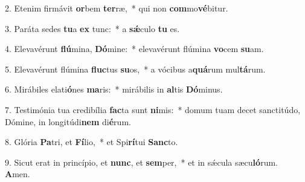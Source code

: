 2. Etenim firmávit \textbf{or}bem \textbf{ter}ræ,~*  qui non \textbf{com}mo\textbf{vé}bitur.\

3. Paráta sedes \textbf{tu}a \textbf{ex} tunc:~*  a \textbf{sǽ}culo \textbf{tu} es.\

4. Elevavérunt \textbf{flú}mina, \textbf{Dó}mine:~*  elevavérunt flúmina \textbf{vo}cem \textbf{su}am.\

5. Elevavérunt flúmina \textbf{fluc}tus \textbf{su}os,~*  a vócibus a\textbf{quá}rum mul\textbf{tá}rum.\

6. Mirábiles elati\textbf{ó}nes \textbf{ma}ris:~*  mirábilis in \textbf{al}tis \textbf{Dó}minus.\

7. Testimónia tua credibília \textbf{fac}ta sunt \textbf{ni}mis:~*  domum tuam decet sanctitúdo, Dómine, in longitúdi\textbf{nem} di\textbf{é}rum.\

8. Glória \textbf{Pa}tri, et \textbf{Fí}lio,~*  et Spi\textbf{rí}tui \textbf{Sanc}to.\

9. Sicut erat in princípio, et \textbf{nunc}, et \textbf{sem}per,~*  et in sǽcula sæcu\textbf{ló}rum. \textbf{A}men.\

